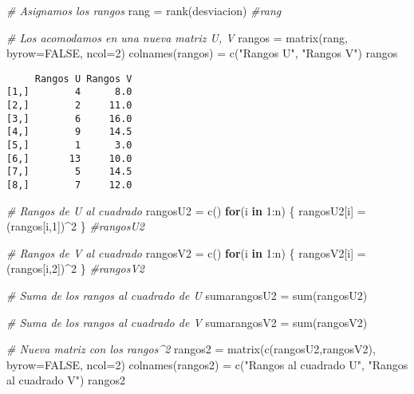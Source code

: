\documentclass[
  a4paper,
  oneside,
  openany]{book}
\newenvironment{Shaded}{\begin{snugshade}}{\end{snugshade}}
\newcommand{\AttributeTok}[1]{\textcolor[rgb]{0.77,0.63,0.00}{#1}}
\newcommand{\CommentTok}[1]{\textcolor[rgb]{0.56,0.35,0.01}{\textit{#1}}}
\newcommand{\ConstantTok}[1]{\textcolor[rgb]{0.00,0.00,0.00}{#1}}
\newcommand{\ControlFlowTok}[1]{\textcolor[rgb]{0.13,0.29,0.53}{\textbf{#1}}}
\newcommand{\DecValTok}[1]{\textcolor[rgb]{0.00,0.00,0.81}{#1}}
\newcommand{\FunctionTok}[1]{\textcolor[rgb]{0.00,0.00,0.00}{#1}}
\newcommand{\NormalTok}[1]{#1}
\newcommand{\OtherTok}[1]{\textcolor[rgb]{0.56,0.35,0.01}{#1}}
\newcommand{\SpecialCharTok}[1]{\textcolor[rgb]{0.00,0.00,0.00}{#1}}
\newcommand{\StringTok}[1]{\textcolor[rgb]{0.31,0.60,0.02}{#1}}
\begin{document}
\begin{Shaded}
\begin{Highlighting}[]
\CommentTok{\# Asignamos los rangos}
\NormalTok{rang }\OtherTok{=} \FunctionTok{rank}\NormalTok{(desviacion)}
\CommentTok{\#rang}

\CommentTok{\# Los acomodamos en una nueva matriz U, V}
\NormalTok{rangos }\OtherTok{=} \FunctionTok{matrix}\NormalTok{(rang, }\AttributeTok{byrow=}\ConstantTok{FALSE}\NormalTok{, }\AttributeTok{ncol=}\DecValTok{2}\NormalTok{)}
\FunctionTok{colnames}\NormalTok{(rangos) }\OtherTok{=} \FunctionTok{c}\NormalTok{(}\StringTok{"Rangos U"}\NormalTok{, }\StringTok{"Rangos V"}\NormalTok{)}
\NormalTok{rangos}
\end{Highlighting}
\end{Shaded}

\begin{verbatim}
     Rangos U Rangos V
[1,]        4      8.0
[2,]        2     11.0
[3,]        6     16.0
[4,]        9     14.5
[5,]        1      3.0
[6,]       13     10.0
[7,]        5     14.5
[8,]        7     12.0
\end{verbatim}

\begin{Shaded}
\begin{Highlighting}[]
\CommentTok{\# Rangos de U al cuadrado}
\NormalTok{rangosU2 }\OtherTok{=} \FunctionTok{c}\NormalTok{()}
\ControlFlowTok{for}\NormalTok{(i }\ControlFlowTok{in} \DecValTok{1}\SpecialCharTok{:}\NormalTok{n) \{}
\NormalTok{  rangosU2[i] }\OtherTok{=}\NormalTok{ (rangos[i,}\DecValTok{1}\NormalTok{])}\SpecialCharTok{\^{}}\DecValTok{2}
\NormalTok{\}}
\CommentTok{\#rangosU2}

\CommentTok{\# Rangos de V al cuadrado}
\NormalTok{rangosV2 }\OtherTok{=} \FunctionTok{c}\NormalTok{()}
\ControlFlowTok{for}\NormalTok{(i }\ControlFlowTok{in} \DecValTok{1}\SpecialCharTok{:}\NormalTok{n) \{}
\NormalTok{  rangosV2[i] }\OtherTok{=}\NormalTok{ (rangos[i,}\DecValTok{2}\NormalTok{])}\SpecialCharTok{\^{}}\DecValTok{2}
\NormalTok{\}}
\CommentTok{\#rangosV2}

\CommentTok{\# Suma de los rangos al cuadrado de U}
\NormalTok{sumarangosU2 }\OtherTok{=} \FunctionTok{sum}\NormalTok{(rangosU2)}

\CommentTok{\# Suma de los rangos al cuadrado de V}
\NormalTok{sumarangosV2 }\OtherTok{=} \FunctionTok{sum}\NormalTok{(rangosV2)}

\CommentTok{\# Nueva matriz con los rangos\^{}2}
\NormalTok{rangos2 }\OtherTok{=} \FunctionTok{matrix}\NormalTok{(}\FunctionTok{c}\NormalTok{(rangosU2,rangosV2), }\AttributeTok{byrow=}\ConstantTok{FALSE}\NormalTok{, }\AttributeTok{ncol=}\DecValTok{2}\NormalTok{)}
\FunctionTok{colnames}\NormalTok{(rangos2) }\OtherTok{=} \FunctionTok{c}\NormalTok{(}\StringTok{"Rangos al cuadrado U"}\NormalTok{, }\StringTok{"Rangos al cuadrado V"}\NormalTok{)}
\NormalTok{rangos2}
\end{Highlighting}
\end{Shaded}
\end{document}
